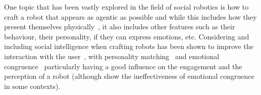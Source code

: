 \documentclass[nomenclature, english, biblatex]{kththesis}
\begin{document}
One topic that has been vastly explored in the field of social robotics is how to craft a robot that appears as agentic as possible and while this includes how they present themselves physically~\cite{salem2012generation, salem2013err, sidner2004look}, it also includes other features such as their behaviour, their personality, if they can express emotions, etc. Considering and including social intelligence when crafting robots has been shown to improve the interaction with the user~\cite{ullrich2017robot, aly2012robot, mobahi2003fuzzy}, with personality matching~\cite{andrist2015look, andriella2020have, esterwood2021birds} and emotional congruence~\cite{ruz2011emotional} particularly having a good influence on the engagement and the perception of a robot (although \textcite{malchus2013role} show the ineffectiveness of emotional congruence in some contexts).
\end{document}
